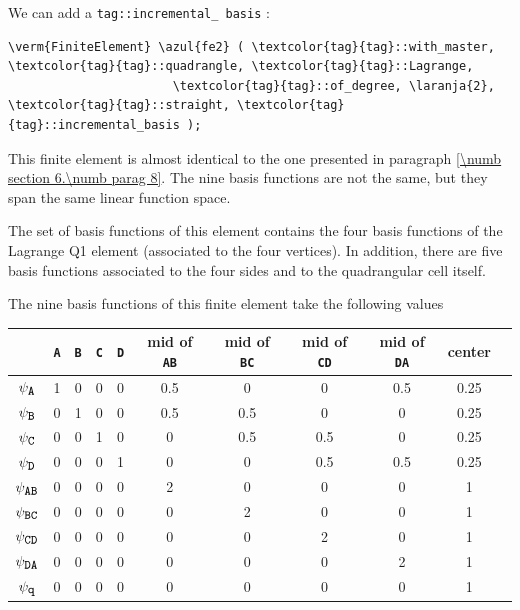 We can add a {\small\tt\textcolor{tag}{tag}::incremental\_\,basis} :

\begin{Verbatim}[commandchars=\\\{\},formatcom=\small\tt,frame=single,
   label=parag-\ref{\numb section 6.\numb parag 9}.cpp,rulecolor=\color{moldura},
   baselinestretch=0.94,framesep=2mm                                            ]
   \verm{FiniteElement} \azul{fe2} ( \textcolor{tag}{tag}::with_master, \textcolor{tag}{tag}::quadrangle, \textcolor{tag}{tag}::Lagrange,
                       \textcolor{tag}{tag}::of_degree, \laranja{2}, \textcolor{tag}{tag}::straight, \textcolor{tag}{tag}::incremental_basis );
\end{Verbatim}

This finite element is almost identical to the one presented in paragraph
\ref{\numb section 6.\numb parag 8}.
The nine basis functions are not the same, but they span the same linear function space.

The set of basis functions of this element contains the four basis functions of the
Lagrange Q1 element (associated to the four vertices).
In addition, there are five basis functions associated to the four sides and to the
quadrangular cell itself.

The nine basis functions of this finite element take the following values

\begin{center}\begin{tabular}{ | c || c | c | c | c | c | c | c | c | c | c | }
  \hline
  & {\small\tt A} & {\small\tt B} & {\small\tt C} & {\small\tt D} & mid of {\small\tt AB} &
  mid of {\small\tt BC} & mid of {\small\tt CD} & mid of {\small\tt DA} & center
  \\ \hline\hline
  $ \psi_{\mbox{\small\tt A}} $ & 1 & 0 & 0 & 0 & 0.5 & 0 & 0 & 0.5 & 0.25
  \\ \hline
  $ \psi_{\mbox{\small\tt B}} $ & 0 & 1 & 0 & 0 & 0.5 & 0.5 & 0 & 0 & 0.25
  \\ \hline
  $ \psi_{\mbox{\small\tt C}} $ & 0 & 0 & 1 & 0 & 0 & 0.5 & 0.5 & 0 & 0.25
  \\ \hline
  $ \psi_{\mbox{\small\tt D}} $ & 0 & 0 & 0 & 1 & 0 & 0 & 0.5 & 0.5 & 0.25
  \\ \hline
  $ \psi_{\mbox{\small\tt AB}} $ & 0 & 0 & 0 & 0 & 2 & 0 & 0 & 0 & 1
  \\ \hline
  $ \psi_{\mbox{\small\tt BC}} $ & 0 & 0 & 0 & 0 & 0 & 2 & 0 & 0 & 1
  \\ \hline
  $ \psi_{\mbox{\small\tt CD}} $ & 0 & 0 & 0 & 0 & 0 & 0 & 2 & 0 & 1
  \\ \hline
  $ \psi_{\mbox{\small\tt DA}} $ & 0 & 0 & 0 & 0 & 0 & 0 & 0 & 2 & 1
  \\ \hline
  $ \psi_{\mbox{\small\tt q}} $ & 0 & 0 & 0 & 0 & 0 & 0 & 0 & 0 & 1
  \\ \hline
\end{tabular}\end{center}


